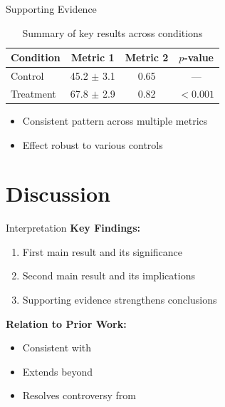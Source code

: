 \documentclass[aspectratio=169,11pt]{beamer}
\begin{document}
\begin{frame}{Supporting Evidence}
  \begin{table}
    \centering
    \caption{Summary of key results across conditions}
    \begin{tabular}{lccc}
      \toprule
      \textbf{Condition} & \textbf{Metric 1} & \textbf{Metric 2} & \textbf{$p$-value} \\
      \midrule
      Control    & 45.2 $\pm$ 3.1 & 0.65 & --- \\
      Treatment  & 67.8 $\pm$ 2.9 & 0.82 & $< 0.001$ \\
      \bottomrule
    \end{tabular}
  \end{table}

  \vspace{0.5cm}

  \begin{itemize}
    \item Consistent pattern across multiple metrics
    \item Effect robust to various controls
  \end{itemize}
\end{frame}


\section{Discussion}

\begin{frame}{Interpretation}
  \textbf{Key Findings:}
  \begin{enumerate}
    \item First main result and its significance
    \item Second main result and its implications
    \item Supporting evidence strengthens conclusions
  \end{enumerate}

  \vspace{0.5cm}

  \textbf{Relation to Prior Work:}
  \begin{itemize}
    \item Consistent with \cite{reference1}
    \item Extends beyond \cite{reference2}
    \item Resolves controversy from \cite{reference3}
  \end{itemize}
\end{frame}
\end{document}
